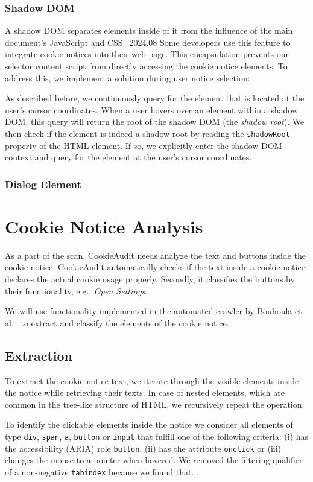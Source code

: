 \subsubsection{Shadow DOM}
A shadow DOM separates elements inside of it from the influence of the main document's JavaScript and CSS~\cite{shadowDomMdn}.2024.08
Some developers use this feature to integrate cookie notices into their web page.
This encapsulation prevents our selector content script from directly accessing the cookie notice elements. 
To address this, we implement a solution during user notice selection:

As described before, we continuously query for the element that is located at the user's cursor coordinates.
When a user hovers over an element within a shadow DOM, this query will return the root of the shadow DOM (the \emph{shadow root}). 
We then check if the element is indeed a shadow root by reading the \verb|shadowRoot| property of the HTML element.
If so, we explicitly enter the shadow DOM context and query for the element at the user's cursor coordinates. 


\subsubsection{Dialog Element}

\section{Cookie Notice Analysis}
As a part of the scan, CookieAudit needs analyze the text and buttons inside the cookie notice.
CookieAudit automatically checks if the text inside a cookie notice declares the actual cookie usage properly. Secondly, it classifies the buttons by their functionality, e.g., \emph{Open Settings}.

We will use functionality implemented in the automated crawler by Bouhoula et al.~\cite{bouhoula2023automated} to extract and classify the elements of the cookie notice. 

\subsection{Extraction}
To extract the cookie notice text, we iterate through the visible elements inside the notice while retrieving their texts. 
In case of nested elements, which are common in the tree-like structure of HTML, we recursively repeat the operation.

To identify the clickable elements inside the notice we consider all elements of type \verb|div|, \verb|span|, \verb|a|, \verb|button| or \verb|input| that fulfill one of the following criteria: 
(i) has the accessibility (ARIA) role \verb|button|, 
(ii) has the attribute \verb|onclick| or 
(iii) changes the mouse to a pointer when hovered.
We removed the filtering qualifier of a non-negative \verb|tabindex| because we found that...

